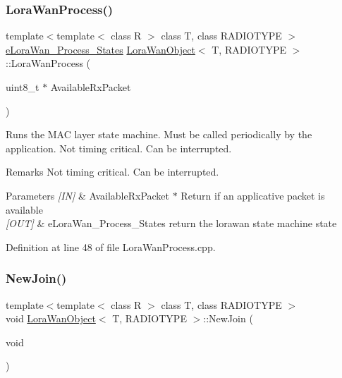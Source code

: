 \subsubsection{\texorpdfstring{Lora\+Wan\+Process()}{LoraWanProcess()}}
{\footnotesize\ttfamily template$<$template$<$ class R $>$ class T, class R\+A\+D\+I\+O\+T\+Y\+PE $>$ \\
\mbox{\hyperlink{_define_8h_acabcd539e4bcc6575c90bd7d857b21f4}{e\+Lora\+Wan\+\_\+\+Process\+\_\+\+States}} \mbox{\hyperlink{class_lora_wan_object}{Lora\+Wan\+Object}}$<$ T, R\+A\+D\+I\+O\+T\+Y\+PE $>$\+::Lora\+Wan\+Process (\begin{DoxyParamCaption}\item[{uint8\+\_\+t $\ast$}]{Available\+Rx\+Packet }\end{DoxyParamCaption})}



Runs the M\+AC layer state machine. Must be called periodically by the application. Not timing critical. Can be interrupted. 

\begin{DoxyRemark}{Remarks}
Not timing critical. Can be interrupted.
\end{DoxyRemark}

\begin{DoxyParams}{Parameters}
{\em \mbox{[}\+I\+N\mbox{]}} & Available\+Rx\+Packet $\ast$ Return if an applicative packet is available \\
\hline
{\em \mbox{[}\+O\+U\+T\mbox{]}} & e\+Lora\+Wan\+\_\+\+Process\+\_\+\+States return the lorawan state machine state \\
\hline
\end{DoxyParams}


Definition at line 48 of file Lora\+Wan\+Process.\+cpp.

\mbox{\label{class_lora_wan_object_adf904fdda3d554b8759258be6d93d902}} 
\subsubsection{\texorpdfstring{New\+Join()}{NewJoin()}}
{\footnotesize\ttfamily template$<$template$<$ class R $>$ class T, class R\+A\+D\+I\+O\+T\+Y\+PE $>$ \\
void \mbox{\hyperlink{class_lora_wan_object}{Lora\+Wan\+Object}}$<$ T, R\+A\+D\+I\+O\+T\+Y\+PE $>$\+::New\+Join (\begin{DoxyParamCaption}\item[{void}]{ }\end{DoxyParamCaption})}



